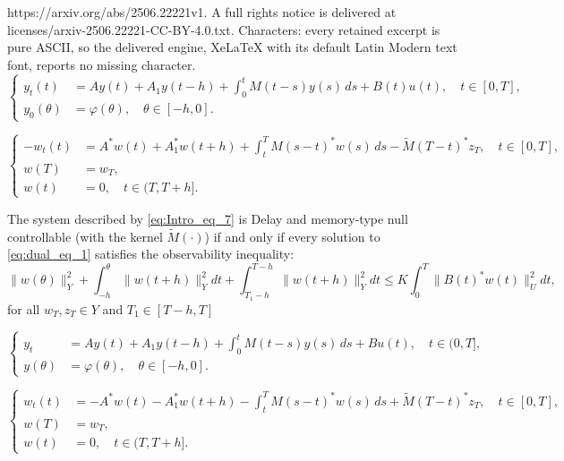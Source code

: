 \documentclass[10pt,a4paper]{amsart}
\begin{document}
https://arxiv.org/abs/2506.22221v1. A full rights notice is delivered at licenses/arxiv-2506.22221-CC-BY-4.0.txt. Characters: every retained excerpt is pure ASCII, so the delivered engine, XeLaTeX with its default Latin Modern text font, reports no missing character.
\begin{equation}
\label{eq:Intro_eq_7}
\left\{
\begin{aligned}
    y_t(t) &= Ay(t) + A_1 y(t-h) + \int_0^t M(t - s)y(s)\,ds + B(t)u(t), \quad t \in [0, T], \\
    y_0(\theta) &= \varphi(\theta),\quad \theta \in [-h, 0].
\end{aligned}
\right.
\end{equation}

\begin{equation}
\label{eq:dual_eq_1}
\left\{
\begin{aligned}
    -w_t(t) &= A^* w(t) + A_1^* w(t + h) + \int_t^T M(s - t)^* w(s)\,ds - \widetilde{M}(T - t)^* z_T, \quad t \in [0, T], \\
    w(T) &= w_T, \\
    w(t) &= 0, \quad t \in (T, T + h].
\end{aligned}
\right.
\end{equation}

\begin{proposition}
\label{prop:2.1}
The system described by \eqref{eq:Intro_eq_7} is Delay and memory-type null controllable (with the kernel $\widetilde{M}(\cdot)$) if and only if every solution to \eqref{eq:dual_eq_1} satisfies the observability inequality:
\begin{equation}
\label{eq:enhanced_obs}
\|w(\theta)\|_Y^2 + \int_{ - h}^{\theta} \|w(t+h)\|_Y^2 dt+ \int_{T_1 - h}^{T-h} \|w(t+h)\|_Y^2 dt \leq K \int_0^T \|B(t)^* w(t)\|_U^2 dt,
\end{equation}
for all $w_T, z_T \in Y$ and $T_1 \in [T - h, T]$
\end{proposition}

\begin{equation}\label{eq:Finite_eq_1}
\left\{
\begin{aligned}
y_t &= Ay(t)+A_1 y(t-h) + \int_0^t M(t-s)y(s)\,ds + Bu(t), \quad t \in (0,T], \\
y(\theta) &= \varphi (\theta), \quad \theta \in [-h, 0].
\end{aligned}
\right.
\end{equation}

\begin{equation}
\label{eq:Finite_eq_2}
\left\{
\begin{aligned}
    w_t(t) &= -A^* w(t) - A_1^* w(t + h) - \int_t^T M(s - t)^* w(s)\,ds +\widetilde{M}(T - t)^* z_T, \quad t \in [0, T], \\
    w(T) &= w_T, \\
    w(t) &= 0, \quad t \in (T, T + h].
\end{aligned}
\right.
\end{equation}
\end{document}
